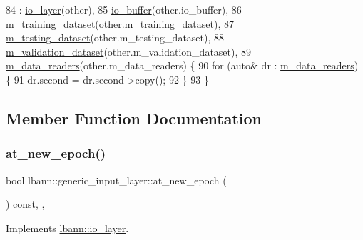 \begin{DoxyCode}
84     : \hyperlink{classlbann_1_1io__layer_ab2b5002dfeb0806062ecf3d9fefb9948}{io\_layer}(other),
85       \hyperlink{classlbann_1_1generic__input__layer_a9dfe8b9afaebc7a5bcb0177ee2ab428f}{io\_buffer}(other.io\_buffer),
86       \hyperlink{classlbann_1_1generic__input__layer_a23716635b1062bfe57f7fcf75140a63a}{m\_training\_dataset}(other.m\_training\_dataset),
87       \hyperlink{classlbann_1_1generic__input__layer_a66b9ec6b393695232bd98edc62fc1348}{m\_testing\_dataset}(other.m\_testing\_dataset),
88       \hyperlink{classlbann_1_1generic__input__layer_abd70adf607d1cef87fb6641af77e816d}{m\_validation\_dataset}(other.m\_validation\_dataset),
89       \hyperlink{classlbann_1_1generic__input__layer_a6bc18860c02beed0252ea3cc87bc48d2}{m\_data\_readers}(other.m\_data\_readers) \{
90     \textcolor{keywordflow}{for} (\textcolor{keyword}{auto}& dr : \hyperlink{classlbann_1_1generic__input__layer_a6bc18860c02beed0252ea3cc87bc48d2}{m\_data\_readers}) \{
91       dr.second = dr.second->copy();
92     \}
93   \}
\end{DoxyCode}


\subsection{Member Function Documentation}
\mbox{\label{classlbann_1_1generic__input__layer_a8b375ab97f38166872e4aa9baeca0715}} 
\subsubsection{\texorpdfstring{at\+\_\+new\+\_\+epoch()}{at\_new\_epoch()}}
{\footnotesize\ttfamily bool lbann\+::generic\+\_\+input\+\_\+layer\+::at\+\_\+new\+\_\+epoch (\begin{DoxyParamCaption}{ }\end{DoxyParamCaption}) const\hspace{0.3cm}{\ttfamily [inline]}, {\ttfamily [override]}, {\ttfamily [virtual]}}



Implements \hyperlink{classlbann_1_1io__layer_a0cedc21bf38c1e3d60a93b41981a1626}{lbann\+::io\+\_\+layer}.



